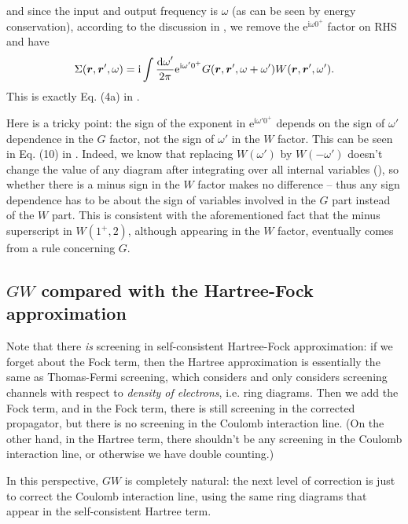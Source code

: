 \documentclass[hyperref, a4paper]{report}
\newcommand*{\ii}{\mathrm{i}}
\newcommand*{\ee}{\mathrm{e}}
\begin{document}
and since the input and output frequency is $\omega$ (as can be seen by energy conservation),
according to the discussion in ,
we remove the $\ee^{\ii \omega 0^+}$ factor on RHS and have 
\begin{equation}
    \Sigma(\vb*{r}, \vb*{r}', \omega)
    = \ii \int \frac{\dd{\omega}'}{2\pi}
    \ee^{\ii \omega' 0^+}
    G(\vb*{r}, \vb*{r}', \omega + \omega')
    W(\vb*{r}, \vb*{r}', \omega').
    \label{eq:gw.sigma-gw}
\end{equation}
This is exactly Eq. (4a) in \cite{berger2020potential}.

Here is a tricky point: 
the sign of the exponent in $\ee^{\ii \omega' 0^+}$
depends on the sign of $\omega'$ dependence in the $G$ factor,
not the sign of $\omega'$ in the $W$ factor.
This can be seen in Eq. (10) in \cite{hybertsen1986electron}.
Indeed, we know that replacing $W(\omega')$ by $W(- \omega')$ 
doesn't change the value of any diagram after integrating over all internal variables
(),
so whether there is a minus sign in the $W$ factor makes no difference
-- thus any sign dependence has to be about the sign of variables involved in the $G$ part 
instead of the $W$ part.
This is consistent with the aforementioned fact that the minus superscript in $W(1^+, 2)$,
although appearing in the $W$ factor, 
eventually comes from a rule concerning $G$.

\subsection{$GW$ compared with the Hartree-Fock approximation}\label{sec:gw.hf}

Note that there \emph{is} screening in self-consistent Hartree-Fock approximation:
if we forget about the Fock term,
then the Hartree approximation is essentially the same as Thomas-Fermi screening,
which considers and only considers screening channels with respect to 
\emph{density of electrons}, 
i.e. ring diagrams.
Then we add the Fock term,
and in the Fock term, 
there is still screening in the corrected propagator,
but there is no screening in the Coulomb interaction line.
(On the other hand, in the Hartree term,
there shouldn't be any screening in the Coulomb interaction line,
or otherwise we have double counting.)

In this perspective, 
$GW$ is completely natural:
the next level of correction is just to correct the Coulomb interaction line,
using the same ring diagrams that appear in the self-consistent Hartree term.
\end{document}
